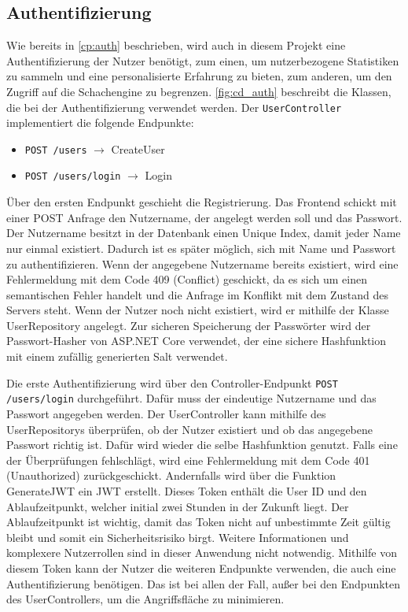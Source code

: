 \subsection{Authentifizierung}
Wie bereits in \autoref{cp:auth} beschrieben, wird auch in diesem Projekt eine Authentifizierung der Nutzer benötigt, zum einen, um nutzerbezogene Statistiken zu sammeln und eine personalisierte Erfahrung zu bieten, zum anderen, um den Zugriff auf die Schachengine zu begrenzen. \autoref{fig:cd_auth} beschreibt die Klassen, die bei der Authentifizierung verwendet werden. Der \lstinline{UserController} implementiert die folgende Endpunkte:

\begin{itemize}
    \item \lstinline{POST /users} $\rightarrow$ CreateUser
    \item \lstinline{POST /users/login} $\rightarrow$ Login
\end{itemize}

Über den ersten Endpunkt geschieht die Registrierung. Das Frontend schickt mit einer POST Anfrage den Nutzername, der angelegt werden soll und das Passwort. Der Nutzername besitzt in der Datenbank einen Unique Index, damit jeder Name nur einmal existiert. Dadurch ist es später möglich, sich mit Name und Passwort zu authentifizieren.
Wenn der angegebene Nutzername bereits existiert, wird eine Fehlermeldung mit dem Code 409 (Conflict) geschickt, da es sich um einen semantischen Fehler handelt und die Anfrage im Konflikt mit dem Zustand des Servers steht. %
Wenn der Nutzer noch nicht existiert, wird er mithilfe der Klasse UserRepository angelegt.
Zur sicheren Speicherung der Passwörter wird der Passwort-Hasher von ASP.NET Core verwendet, der eine sichere Hashfunktion mit einem zufällig generierten Salt verwendet.

Die erste Authentifizierung wird über den Controller-Endpunkt \lstinline{POST /users/login} durchgeführt. Dafür muss der eindeutige Nutzername und das Passwort angegeben werden. Der UserController kann mithilfe des UserRepositorys überprüfen, ob der Nutzer existiert und ob das angegebene Passwort richtig ist. Dafür wird wieder die selbe Hashfunktion genutzt. Falls eine der Überprüfungen fehlschlägt, wird eine Fehlermeldung mit dem Code 401 (Unauthorized) zurückgeschickt. Andernfalls wird über die Funktion GenerateJWT ein \ac{JWT} erstellt. Dieses Token enthält die User ID und den Ablaufzeitpunkt, welcher initial zwei Stunden in der Zukunft liegt. Der Ablaufzeitpunkt ist wichtig, damit das Token nicht auf unbestimmte Zeit gültig bleibt und somit ein Sicherheitsrisiko birgt. Weitere Informationen und komplexere Nutzerrollen sind in dieser Anwendung nicht notwendig. Mithilfe von diesem Token kann der Nutzer die weiteren Endpunkte verwenden, die auch eine Authentifizierung benötigen. Das ist bei allen der Fall, außer bei den Endpunkten des UserControllers, um die Angriffsfläche zu minimieren.


